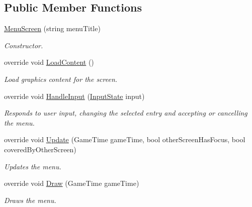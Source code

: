 \subsection*{Public Member Functions}
\begin{DoxyCompactItemize}
\item 
\hyperlink{classCityMania_1_1MenuScreen_a21cdf9ff5eee4bc23ba30a59b297c765}{MenuScreen} (string menuTitle)
\begin{DoxyCompactList}\small\item\em Constructor. \item\end{DoxyCompactList}\item 
override void \hyperlink{classCityMania_1_1MenuScreen_ad3892ecccfde65f286cebd1f83083cd1}{LoadContent} ()
\begin{DoxyCompactList}\small\item\em Load graphics content for the screen. \item\end{DoxyCompactList}\item 
override void \hyperlink{classCityMania_1_1MenuScreen_a9ec18d09465dd6ca3a476193bd25e0bd}{HandleInput} (\hyperlink{classCityMania_1_1InputState}{InputState} input)
\begin{DoxyCompactList}\small\item\em Responds to user input, changing the selected entry and accepting or cancelling the menu. \item\end{DoxyCompactList}\item 
override void \hyperlink{classCityMania_1_1MenuScreen_af5c5b89dcc99c92d99ec3e0924e7bea1}{Update} (GameTime gameTime, bool otherScreenHasFocus, bool coveredByOtherScreen)
\begin{DoxyCompactList}\small\item\em Updates the menu. \item\end{DoxyCompactList}\item 
override void \hyperlink{classCityMania_1_1MenuScreen_a433f334c09ea523b02322bd153e960d1}{Draw} (GameTime gameTime)
\begin{DoxyCompactList}\small\item\em Draws the menu. \item\end{DoxyCompactList}\end{DoxyCompactItemize}
